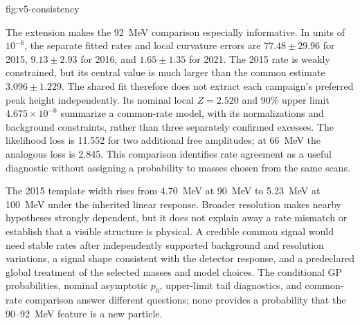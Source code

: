 {fig:v5-consistency}
\FloatBarrier


The extension makes the 92~MeV comparison especially informative. In units
of $10^{-6}$, the separate fitted rates and local curvature errors are
$77.48\pm29.96$ for 2015, $9.13\pm2.93$ for 2016, and
$1.65\pm1.35$ for 2021. The 2015 rate is weakly constrained, but its central
value is much larger than the common estimate $3.096\pm1.229$.
The shared fit therefore does not extract each campaign's preferred peak
height independently. Its nominal local $Z=2.520$ and 90\% \CLs{} upper
limit $4.675\times10^{-6}$ summarize a common-rate model, with its
normalizations and background constraints, rather than three separately
confirmed excesses. The likelihood loss is 11.552 for two additional free
amplitudes; at 66~MeV the analogous loss is 2.845. This comparison identifies
rate agreement as a useful diagnostic without assigning a probability to
masses chosen from the same scans.

The 2015 template width rises from 4.70~MeV at 90~MeV to 5.23~MeV at
100~MeV under the inherited linear response. Broader resolution makes nearby
hypotheses strongly dependent, but it does not explain away a rate mismatch
or establish that a visible structure is physical. A credible common signal
would need stable rates after independently supported background and resolution
variations, a signal shape consistent with the detector response, and a
predeclared global treatment of the selected masses and model choices.
The conditional GP probabilities, nominal asymptotic $p_0$, upper-limit tail
diagnostics, and common-rate comparison answer different questions; none
provides a probability that the 90--92~MeV feature is a new particle.

\clearpage
